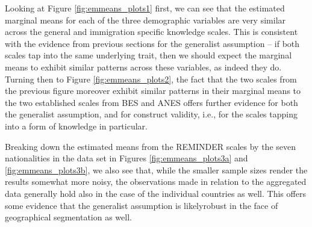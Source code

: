 \documentclass[12pt,halfline,a4paper,]{ouparticle}
\begin{document}
Looking at Figure \ref{fig:emmeans_plots1} first, we can see that the
estimated marginal means for each of the three demographic variables are
very similar across the general and immigration specific knowledge
scales. This is consistent with the evidence from previous sections for
the generalist assumption -- if both scales tap into the same underlying
trait, then we should expect the marginal means to exhibit similar
patterns across these variables, as indeed they do. Turning then to
Figure \ref{fig:emmeans_plots2}, the fact that the two scales from the
previous figure moreover exhibit similar patterns in their marginal
means to the two established scales from BES and ANES offers further
evidence for both the generalist assumption, and for construct validity,
i.e., for the scales tapping into a form of knowledge in particular.

Breaking down the estimated means from the REMINDER scales by the seven
nationalities in the data set in Figures \ref{fig:emmeans_plots3a} and
\ref{fig:emmeans_plots3b}, we also see that, while the smaller sample
sizes render the results somewhat more noisy, the observations made in
relation to the aggregated data generally hold also in the case of the
individual countries as well. This offers some evidence that the
generalist assumption is likelyrobust in the face of geographical
segmentation as well.
\end{document}
